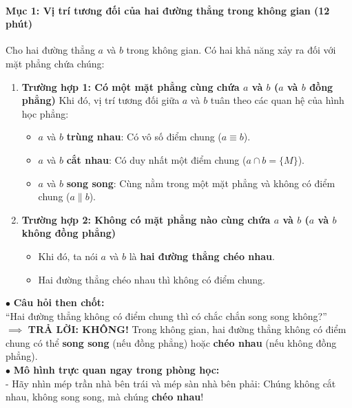 \documentclass[12pt, a4paper]{article}
\begin{document}
\paragraph{Mục 1: Vị trí tương đối của hai đường thẳng trong không gian (12 phút)}
Cho hai đường thẳng $a$ và $b$ trong không gian. Có hai khả năng xảy ra đối với mặt phẳng chứa chúng:
\begin{enumerate}[label=\textbf{\arabic*.}]
    \item \textbf{Trường hợp 1: Có một mặt phẳng cùng chứa $a$ và $b$ ($a$ và $b$ đồng phẳng)}
    Khi đó, vị trí tương đối giữa $a$ và $b$ tuân theo các quan hệ của hình học phẳng:
    \begin{itemize}
        \item $a$ và $b$ \textbf{trùng nhau}: Có vô số điểm chung ($a \equiv b$).
        \item $a$ và $b$ \textbf{cắt nhau}: Có duy nhất một điểm chung ($a \cap b = \{M\}$).
        \item $a$ và $b$ \textbf{song song}: Cùng nằm trong một mặt phẳng và không có điểm chung ($a \parallel b$).
    \end{itemize}
    \item \textbf{Trường hợp 2: Không có mặt phẳng nào cùng chứa $a$ và $b$ ($a$ và $b$ không đồng phẳng)}
    \begin{itemize}
        \item Khi đó, ta nói $a$ và $b$ là \textbf{hai đường thẳng chéo nhau}.
        \item Hai đường thẳng chéo nhau thì không có điểm chung.
    \end{itemize}
\end{enumerate}

\begin{scaffoldbox}
    $\bullet$ \textbf{Câu hỏi then chốt:}\\
    ``Hai đường thẳng không có điểm chung thì có chắc chắn song song không?''\\
    $\implies$ \textbf{TRẢ LỜI: KHÔNG!} Trong không gian, hai đường thẳng không có điểm chung có thể \textbf{song song} (nếu đồng phẳng) hoặc \textbf{chéo nhau} (nếu không đồng phẳng).\\
    $\bullet$ \textbf{Mô hình trực quan ngay trong phòng học:}\\
    - Hãy nhìn mép trần nhà bên trái và mép sàn nhà bên phải: Chúng không cắt nhau, không song song, mà chúng \textbf{chéo nhau}!
\end{scaffoldbox}
\end{document}
